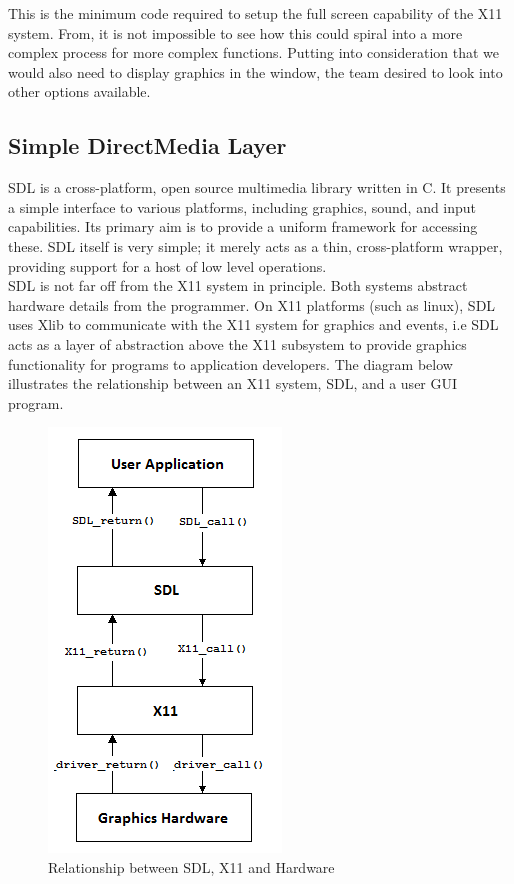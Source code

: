 \documentclass[11pt]{report} %
\begin{document}
This is the minimum code required to setup the full screen capability of the X11 system.
From, it is not impossible to see how this could spiral into a more 
complex process for more complex functions. Putting into consideration that we would also
need to display graphics in the window, the team desired to look into other options available.\\

\subsection {Simple DirectMedia Layer}
SDL is a cross-platform, open source multimedia library written in C. It presents a simple
interface to various platforms, including graphics, sound, and input capabilities. Its primary aim is to provide
a uniform framework for accessing these. SDL itself is very simple;
it merely acts as a thin, cross-platform wrapper, providing support for a host of low level operations.\\

SDL is not far off from the X11 system in principle. Both systems abstract hardware
details from the programmer. On X11 platforms (such as linux), SDL uses Xlib to
communicate with the X11 system for graphics and events, i.e SDL acts as a layer of
abstraction above the X11 subsystem to provide graphics functionality for programs to application developers.
The diagram below illustrates the relationship between an X11 system, SDL, and a user GUI program.\\

\begin{figure}[H]
		\centering
		\includegraphics[scale=0.70]{images/several_layers.png}
		\caption{Relationship between SDL, X11 and Hardware}\label{fig:several_layers_diagram}
	\end{figure}
\end{document}
